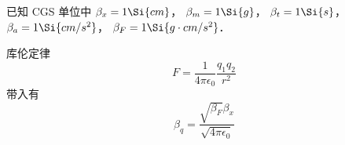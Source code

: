 
已知 CGS 单位中 $\beta_x = 1\Si{cm}$， $\beta_m = 1\Si{g}$， $\beta_t = 1\Si{s}$， $\beta_a = 1\Si{cm/s^2}$， $\beta_F = 1\Si{g \cdot cm/s^2}$．

库伦定律
\begin{equation}
F = \frac{1}{4\pi\epsilon_0}\frac{q_1 q_2}{r^2}
\end{equation}
带入有
\begin{equation}
\beta_q = \frac{\sqrt{\beta_F} \beta_x}{\sqrt{4\pi\epsilon_0}}
\end{equation}
